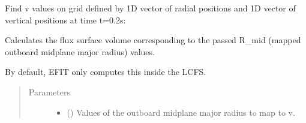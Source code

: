 \documentclass[letterpaper,10pt,english]{sphinxmanual}
\begin{document}
\begin{fulllineitems}
\begin{fulllineitems}
\begin{sphinxVerbatim}[commandchars=\\\{\}]
  \PYG{p}{[} \PYG{p}{]} \PYG{p}{[} \PYG{p}{]} \PYG{p}{[} \PYG{p}{]} 
\end{sphinxVerbatim}

Find v values on grid defined by 1D vector of radial positions 
and 1D vector of vertical positions  at time t=0.2s:

\begin{sphinxVerbatim}[commandchars=\\\{\}]
     
\end{sphinxVerbatim}

\end{fulllineitems}


\begin{fulllineitems}
\label{\detokenize{eqtools:eqtools.core.Equilibrium.rmid2v}}
Calculates the flux surface volume corresponding to the passed R\_mid (mapped outboard midplane major radius) values.

By default, EFIT only computes this inside the LCFS.
\begin{quote}\begin{description}
\item[{Parameters}] \leavevmode\begin{itemize}
\item {} 
 () \textendash{} Values of the outboard midplane
major radius to map to v.


\end{itemize}
\end{description}
\end{quote}
\end{fulllineitems}
\end{fulllineitems}
\end{document}

